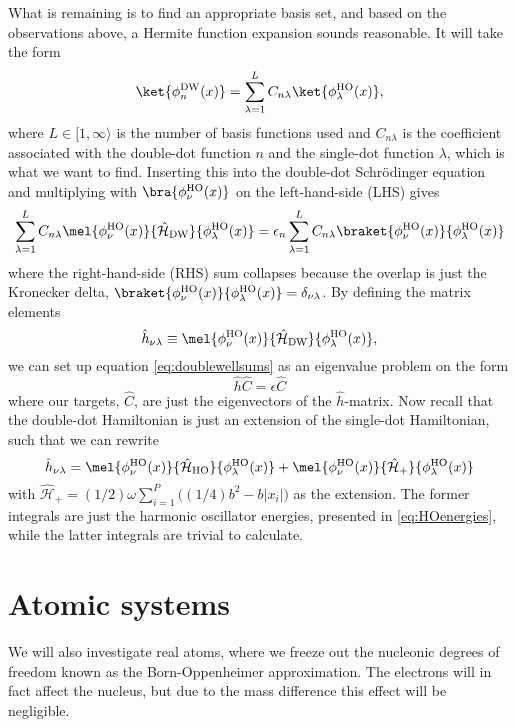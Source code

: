 What is remaining is to find an appropriate basis set, and based on the observations above, a Hermite function expansion sounds reasonable. It will take the form
\begin{equation}
\ket{\phi_n^{\text{DW}}(x)}=\sum_{\lambda=1}^{L}C_{n\lambda}\ket{\phi_{\lambda}^{\text{HO}}(x)},
\end{equation}
where $L\in[1,\infty\rangle$ is the number of basis functions used and $C_{n\lambda}$ is the coefficient associated with the double-dot function $n$ and the single-dot function $\lambda$, which is what we want to find. Inserting this into the double-dot Schrödinger equation and multiplying with $\bra{\phi_{\nu}^{\text{HO}}(x)}$ on the left-hand-side (LHS) gives
\begin{equation}
\label{eq:doublewellsums}
\sum_{\lambda=1}^LC_{n\lambda}\mel{\phi_{\nu}^{\text{HO}}(x)}{\hat{\mathcal{H}}_{\text{DW}}}{\phi_{\lambda}^{\text{HO}}(x)}=\epsilon_n\sum_{\lambda=1}^LC_{n\lambda}\braket{\phi_{\nu}^{\text{HO}}(x)}{\phi_{\lambda}^{\text{HO}}(x)}
\end{equation}
where the right-hand-side (RHS) sum collapses because the overlap is just the Kronecker delta, $\braket{\phi_{\nu}^{\text{HO}}(x)}{\phi_{\lambda}^{\text{HO}}(x)}=\delta_{\nu\lambda}$. By defining the matrix elements
\begin{equation}
\hat{h}_{\nu\lambda}\equiv\mel{\phi_{\nu}^{\text{HO}}(x)}{\hat{\mathcal{H}}_{\text{DW}}}{\phi_{\lambda}^{\text{HO}}(x)},
\end{equation}
we can set up equation \eqref{eq:doublewellsums} as an eigenvalue problem on the form
\begin{equation}
\hat{h}\hat{C}=\epsilon\hat{C}
\end{equation}
where our targets, $\hat{C}$, are just the eigenvectors of the $\hat{h}$-matrix. Now recall that the double-dot Hamiltonian is just an extension of the single-dot Hamiltonian, such that we can rewrite
\begin{equation}
\hat{h}_{\nu\lambda}=\mel{\phi_{\nu}^{\text{HO}}(x)}{\hat{\mathcal{H}}_{\text{HO}}}{\phi_{\lambda}^{\text{HO}}(x)}+\mel{\phi_{\nu}^{\text{HO}}(x)}{\hat{\mathcal{H}}_{\text{+}}}{\phi_{\lambda}^{\text{HO}}(x)}
\end{equation}
with $\hat{\mathcal{H}}_{\text{+}}=(1/2)\omega\sum_{i=1}^P\Big((1/4)b^2-b|x_i|\Big)$ as the extension. The former integrals are just the harmonic oscillator energies, presented in \eqref{eq:HOenergies}, while the latter integrals are trivial to calculate.

\section{Atomic systems} \label{sec:atomic}
We will also investigate real atoms, where we freeze out the nucleonic degrees of freedom known as the Born-Oppenheimer approximation. The electrons will in fact affect the nucleus, but due to the mass difference this effect will be negligible.

